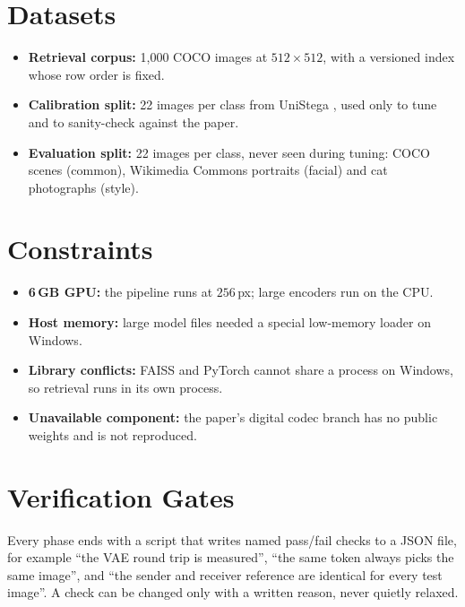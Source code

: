 \section{Datasets}
\begin{itemize}
	\item \textbf{Retrieval corpus:} 1{,}000 COCO \cite{lin2014coco} images at $512\times512$, with
	a versioned index whose row order is fixed.
	\item \textbf{Calibration split:} 22 images per class from UniStega \cite{yang2024diffstega},
	used only to tune and to sanity-check against the paper.
	\item \textbf{Evaluation split:} 22 images per class, never seen during tuning: COCO scenes
	(common), Wikimedia Commons portraits (facial) and cat photographs (style).
\end{itemize}

\section{Constraints}
\begin{itemize}
	\item \textbf{6\,GB GPU:} the pipeline runs at $256$\,px; large encoders run on the CPU.
	\item \textbf{Host memory:} large model files needed a special low-memory loader on Windows.
	\item \textbf{Library conflicts:} FAISS and PyTorch cannot share a process on Windows, so
	retrieval runs in its own process.
	\item \textbf{Unavailable component:} the paper's digital codec branch has no public weights
	and is not reproduced.
\end{itemize}

\section{Verification Gates}\label{sec:gates}
Every phase ends with a script that writes named pass/fail checks to a JSON file, for example
``the VAE round trip is measured'', ``the same token always picks the same image'', and ``the
sender and receiver reference are identical for every test image''. A check can be changed only
with a written reason, never quietly relaxed.
